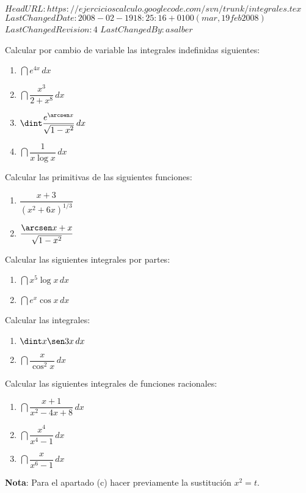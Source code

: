 \svnidlong
{$HeadURL: https://ejercicioscalculo.googlecode.com/svn/trunk/integrales.tex $}
{$LastChangedDate: 2008-02-19 18:25:16 +0100 (mar, 19 feb 2008) $}
{$LastChangedRevision: 4 $}
{$LastChangedBy: asalber $}
%
{Calcular por cambio de variable las integrales indefinidas siguientes:
\begin{multicols}{2}
\begin{enumerate}
\item $\dint e^{4x}\, dx$
\item $\dint \dfrac{x^{3}}{2+x^{8}}\, dx$
\item $\dint \dfrac{e^{\arcsen x}}{\sqrt{1-x^{2}}}\, dx$
\item $\dint \dfrac{1}{x\log x}\, dx$
\end{enumerate}
\end{multicols}
}


{Calcular las primitivas de las siguientes funciones:
\begin{multicols}{2}
\begin{enumerate}
\item $\dfrac{x+3}{\left( x^{2}+6x\right) ^{1/3}}$
\item $\dfrac{\arcsen x+x}{\sqrt{1-x^{2}}}$
\end{enumerate}
\end{multicols}
}


{Calcular las siguientes integrales por partes:
\begin{multicols}{2}
\begin{enumerate}
\item $\dint x^{5}\log x\, dx$
\item $\dint e^{x}\cos x\, dx$
\end{enumerate}
\end{multicols}
}


{Calcular las integrales:
\begin{multicols}{2}
\begin{enumerate}
\item $\dint x\sen 3x\,dx$
\item $\dint \dfrac{x}{\cos^{2}x}\,dx$
\end{enumerate}
\end{multicols}
}


{Calcular las siguientes integrales de funciones racionales:
\begin{multicols}{2}
\begin{enumerate}\setlength{\itemsep}{3mm}
\item $\dint \dfrac{x+1}{x^{2}-4x+8}\,dx$
\item $\dint \dfrac{x^{4}}{x^{4}-1}\,dx$
\item $\dint \dfrac{x}{x^{6}-1}\,dx$ 
\end{enumerate}
\end{multicols}
\textbf{Nota}: Para el apartado (c) hacer previamente la sustitución $x^{2}=t$.
}


